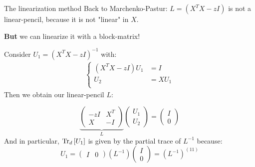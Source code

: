 \documentclass[10pt]{beamer}
\begin{document}
\begin{frame}{The linearization method}
  Back to Marchenko-Pastur: $L = (X^TX - zI)$ is not a linear-pencil, because it is not "linear" in $X$.
  
  \textbf{But} we can linearize it with a block-matrix!

  Consider $U_1 = (X^TX - zI)^{-1}$ with:
  \begin{align*}
    \begin{cases}
      (X^TX - zI) U_1 & = I\\
      U_2 & = X U_1\\
    \end{cases}
  \end{align*}
  \vspace*{-0.1cm}
  Then we obtain our linear-pencil $L$:

  \begin{equation*}
    \underbrace{
    \begin{pmatrix}
      -zI & X^T\\
      X & -I
    \end{pmatrix}
    }_{L}
    \begin{pmatrix}
      U_1\\
      U_2
    \end{pmatrix}
    = \begin{pmatrix}
      I\\
      0
    \end{pmatrix}
  \end{equation*}
  And in particular, $\traceLim[d]{U_1}$ is given by the partial trace of $L^{-1}$ because:
  \begin{equation*}
    U_1 = \begin{pmatrix}
      I & 0
    \end{pmatrix}
    (L^{-1})
    \begin{pmatrix}
      I\\
      0
    \end{pmatrix}
    = (L^{-1})^{(11)}
  \end{equation*}
\end{frame}
\end{document}
